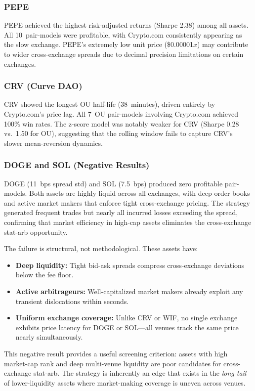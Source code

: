 \documentclass[sigconf,nonacm=false]{acmart}
\begin{document}
\subsubsection{PEPE}

PEPE achieved the highest risk-adjusted returns (Sharpe 2.38) among all assets. All 10~pair-models were profitable, with Crypto.com consistently appearing as the slow exchange. PEPE's extremely low unit price (\$0.00001$x$) may contribute to wider cross-exchange spreads due to decimal precision limitations on certain exchanges.

\subsubsection{CRV (Curve DAO)}

CRV showed the longest OU half-life (38~minutes), driven entirely by Crypto.com's price lag. All 7~OU pair-models involving Crypto.com achieved 100\% win rates. The z-score model was notably weaker for CRV (Sharpe 0.28 vs.\ 1.50 for OU), suggesting that the rolling window fails to capture CRV's slower mean-reversion dynamics.

\subsubsection{DOGE and SOL (Negative Results)}

DOGE (11~bps spread std) and SOL (7.5~bps) produced zero profitable pair-models. Both assets are highly liquid across all exchanges, with deep order books and active market makers that enforce tight cross-exchange pricing. The strategy generated frequent trades but nearly all incurred losses exceeding the spread, confirming that market efficiency in high-cap assets eliminates the cross-exchange stat-arb opportunity.

The failure is structural, not methodological. These assets have:\vspace{-0.5em}
\begin{itemize}
    \item \textbf{Deep liquidity:} Tight bid-ask spreads compress cross-exchange deviations below the fee floor.
    \item \textbf{Active arbitrageurs:} Well-capitalized market makers already exploit any transient dislocations within seconds.
    \item \textbf{Uniform exchange coverage:} Unlike CRV or WIF, no single exchange exhibits price latency for DOGE or SOL---all venues track the same price nearly simultaneously.
\end{itemize}\vspace{-0.5em}
This negative result provides a useful screening criterion: assets with high market-cap rank and deep multi-venue liquidity are poor candidates for cross-exchange stat-arb. The strategy is inherently an edge that exists in the \emph{long tail} of lower-liquidity assets where market-making coverage is uneven across venues.
\end{document}
